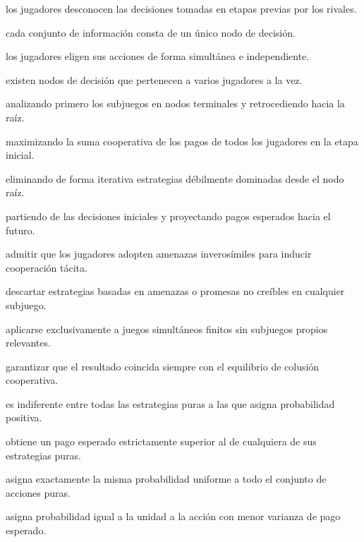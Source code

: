 \begin{opts}
    \item los jugadores desconocen las decisiones tomadas en etapas previas por los rivales.
    \item cada conjunto de información consta de un único nodo de decisión.
    \item los jugadores eligen sus acciones de forma simultánea e independiente.
    \item existen nodos de decisión que pertenecen a varios jugadores a la vez.
\end{opts}

\begin{opts}
    \item analizando primero los subjuegos en nodos terminales y retrocediendo hacia la raíz.
    \item maximizando la suma cooperativa de los pagos de todos los jugadores en la etapa inicial.
    \item eliminando de forma iterativa estrategias débilmente dominadas desde el nodo raíz.
    \item partiendo de las decisiones iniciales y proyectando pagos esperados hacia el futuro.
\end{opts}

\begin{opts}
    \item admitir que los jugadores adopten amenazas inverosímiles para inducir cooperación tácita.
    \item descartar estrategias basadas en amenazas o promesas no creíbles en cualquier subjuego.
    \item aplicarse exclusivamente a juegos simultáneos finitos sin subjuegos propios relevantes.
    \item garantizar que el resultado coincida siempre con el equilibrio de colusión cooperativa.
\end{opts}

\begin{opts}
    \item es indiferente entre todas las estrategias puras a las que asigna probabilidad positiva.
    \item obtiene un pago esperado estrictamente superior al de cualquiera de sus estrategias puras.
    \item asigna exactamente la misma probabilidad uniforme a todo el conjunto de acciones puras.
    \item asigna probabilidad igual a la unidad a la acción con menor varianza de pago esperado.
\end{opts}

